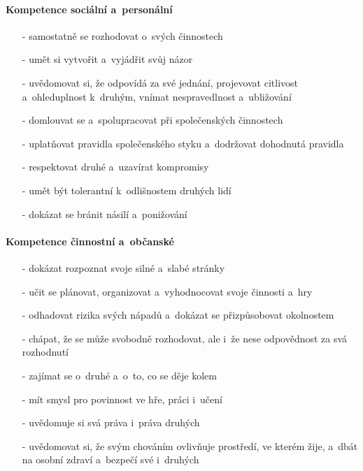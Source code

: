 				\paragraph{Kompetence sociální a~personální}
				\begin{itemize}
				\setlength\itemsep{-2mm}
				\item[-] samostatně se rozhodovat o~svých činnostech
				\item[-] umět si vytvořit a~vyjádřit svůj názor
				\item[-] uvědomovat si, že odpovídá za své jednání, projevovat citlivost a~ohleduplnost k druhým, vnímat nespravedlnost a~ubližování
				\item[-] domlouvat se a~spolupracovat při společenských činnostech
				\item[-] uplatňovat pravidla společenského styku a~dodržovat dohodnutá pravidla 
				\item[-] respektovat druhé a~uzavírat kompromisy 
				\item[-] umět být tolerantní k odlišnostem druhých lidí
				\item[-] dokázat se bránit násilí a~ponižování
				\end{itemize}

				\paragraph{Kompetence činnostní a~občanské}
				\begin{itemize}
				\setlength\itemsep{-2mm}
				\item[-] dokázat rozpoznat svoje silné a~slabé stránky
				\item[-] učit se plánovat, organizovat a vyhodnocovat svoje činnosti a~hry
				\item[-] odhadovat rizika svých nápadů a~dokázat se přizpůsobovat okolnostem
				\item[-] chápat, že se může svobodně rozhodovat, ale i~že nese odpovědnost za svá rozhodnutí
				\item[-] zajímat se o~druhé a~o~to, co se děje kolem
				\item[-] mít smysl pro povinnost ve hře, práci i~učení
				\item[-] uvědomuje si svá práva i~práva druhých
				\item[-] uvědomovat si, že svým chováním ovlivňuje prostředí, ve kterém žije, a~dbát na osobní zdraví a~bezpečí své i~druhých
				\end{itemize}



